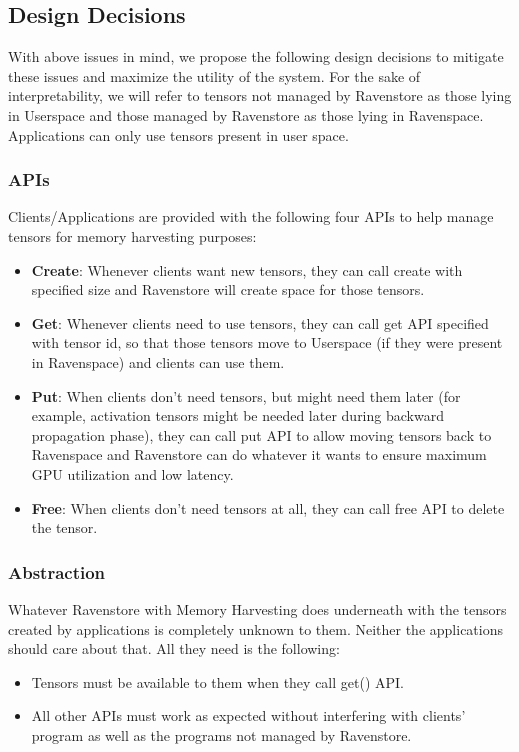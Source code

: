 \documentclass{article}
\begin{document}
\subsection{Design Decisions}
With above issues in mind, we propose the following design decisions to mitigate these issues and maximize
the utility of the system. For the sake of interpretability, we will refer to tensors not managed by Ravenstore as those lying in
Userspace and those managed by Ravenstore as those lying in Ravenspace. Applications can only use tensors present in user space.
	\subsubsection{APIs}Clients/Applications are provided with the following four APIs to help manage tensors for memory harvesting purposes:
	\begin{itemize}
		\item \textbf{Create}: Whenever clients want new tensors, they can call create with specified size and Ravenstore will
		create space for those tensors.
		\item \textbf{Get}: Whenever clients need to use tensors, they can call get API specified with tensor id, so that those tensors
		move to Userspace (if they were present in Ravenspace) and clients can use them.
		\item \textbf{Put}: When clients don't need tensors, but might need them later (for example, activation tensors might be needed later during backward propagation phase),
		they can call put API to allow moving tensors back to Ravenspace and Ravenstore can do whatever it wants to ensure maximum GPU utilization and low latency.
		\item \textbf{Free}: When clients don't need tensors at all, they can call free API to delete the tensor.
	\end{itemize}
	\subsubsection{Abstraction}Whatever Ravenstore with Memory Harvesting does underneath with the tensors created by applications is completely
	unknown to them. Neither the applications should care about that. All they need is the following:
	\begin{itemize}
		\item Tensors must be available to them when they call get() API.
		\item All other APIs must work as expected without interfering with clients' program as well as the programs not managed by Ravenstore.
	\end{itemize}
\end{document}
